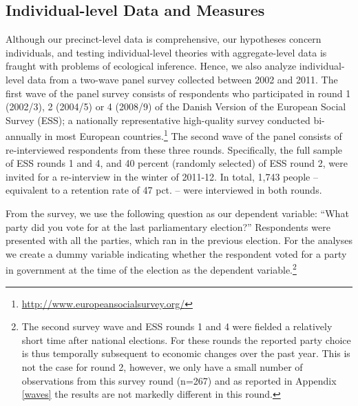 \documentclass[12pt,a4paper]{article}
\begin{document}
	\subsection{Individual-level Data and Measures}\label{individuallevel}
	Although our precinct-level data is comprehensive, our hypotheses concern individuals, and testing individual-level theories with aggregate-level data is fraught with problems of ecological inference. Hence, we also analyze individual-level data from a two-wave panel survey collected between 2002 and 2011. The first wave of the panel survey consists of respondents who participated in round 1 (2002/3), 2 (2004/5) or 4 (2008/9) of the Danish Version of the European Social Survey (ESS); a nationally representative high-quality survey conducted bi-annually in most European countries.\footnote{\href{http://www.europeansocialsurvey.org/}{http://www.europeansocialsurvey.org/}} The second wave of the panel consists of re-interviewed respondents from these three rounds. Specifically, the full sample of ESS rounds 1 and 4, and 40 percent (randomly selected) of ESS round 2, were invited for a re-interview in the winter of 2011-12. In total, 1,743 people – equivalent to a retention rate of 47 pct. – were interviewed in both rounds. 
	
	From the survey, we use the following question as our dependent variable: ``What party did you vote for at the last parliamentary election?'' Respondents were presented with all the parties, which ran in the previous election. For the analyses we create a dummy variable indicating whether the respondent voted for a party in government at the time of the election as the dependent variable.\footnote{The second survey wave and ESS rounds 1 and 4  were fielded a relatively short time after national elections. For these rounds the reported party choice is thus temporally subsequent to economic changes over the past year. This is not the case for round 2, however, we only have a small number of observations from this survey round (n=267) and as reported in Appendix \ref{waves} the results are not markedly different in this round.} 
	
\end{document}
